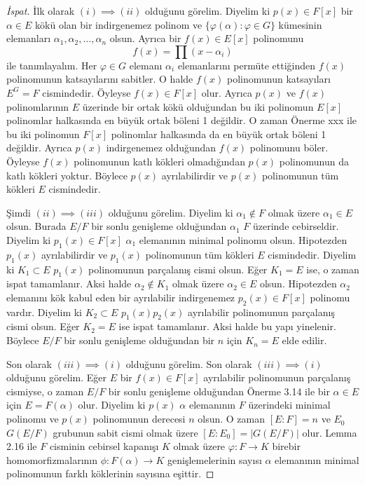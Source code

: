 \documentclass[draft]{article}
\theoremstyle{definition}
\theoremstyle{remark}
\newcommand{\envert}[1]{\left\lvert#1\right\rvert}
\let\abs=\envert
\begin{document}
    		\begin{proof}[İspat]
    	        İlk olarak $(i) \implies (ii)$ olduğunu görelim. Diyelim ki $p(x) \in F[x]$ bir $\alpha \in E$ kökü olan bir indirgenemez polinom ve $\{\varphi(\alpha) : \varphi \in G\}$ kümesinin elemanları $\alpha_1, \alpha_2, \dots, \alpha_n$ olsun. Ayrıca bir $f(x) \in E[x]$ polinomunu
    	        \begin{equation*}
    	            f(x) = \prod{(x - \alpha_i)}
    	        \end{equation*}
    	        ile tanımlayalım. Her $\varphi \in G$ elemanı $\alpha_i$ elemanlarını permüte ettiğinden $f(x)$ polinomunun katsayılarını sabitler. O halde $f(x)$ polinomunun katsayıları $E^G = F$ cismindedir. Öyleyse $f(x) \in F[x]$ olur. Ayrıca $p(x)$ ve $f(x)$ polinomlarının $E$ üzerinde bir ortak kökü olduğundan bu iki polinomun $E[x]$ polinomlar halkasında en büyük ortak böleni 1 değildir. O zaman Önerme xxx ile bu iki polinomun $F[x]$ polinomlar halkasında da en büyük ortak böleni 1 değildir. Ayrıca $p(x)$ indirgenemez olduğundan $f(x)$ polinomunu böler. Öyleyse $f(x)$ polinomunun katlı kökleri olmadığından $p(x)$ polinomunun da katlı kökleri yoktur. Böylece $p(x)$ ayrılabilirdir ve $p(x)$ polinomunun tüm kökleri $E$ cismindedir.\par
    	        Şimdi $(ii) \implies (iii)$ olduğunu görelim. Diyelim ki $\alpha_1 \notin F$ olmak üzere $\alpha_1 \in E$ olsun. Burada $E/F$ bir sonlu genişleme olduğundan $\alpha_1$ $F$ üzerinde cebirseldir. Diyelim ki $p_1(x) \in F[x]$ $\alpha_1$ elemanının minimal polinomu olsun. Hipotezden $p_1(x)$ ayrılabilirdir ve $p_1(x)$ polinomunun tüm kökleri $E$ cismindedir. Diyelim ki $K_1 \subset E$ $p_1(x)$ polinomunun parçalanış cismi olsun. Eğer $K_1 = E$ ise, o zaman ispat tamamlanır. Aksi halde $\alpha_2 \notin K_1$ olmak üzere $\alpha_2 \in E$ olsun. Hipotezden $\alpha_2$ elemanını kök kabul eden bir ayrılabilir indirgenemez $p_2(x) \in F[x]$ polinomu vardır. Diyelim ki $K_2 \subset E$ $p_1(x)p_2(x)$ ayrılabilir polinomunun parçalanış cismi olsun. Eğer $K_2 = E$ ise ispat tamamlanır. Aksi halde bu yapı yinelenir. Böylece $E/F$ bir sonlu genişleme olduğundan bir $n$ için $K_n = E$ elde edilir.\par
    	        Son olarak $(iii) \implies (i)$ olduğunu görelim. Son olarak $(iii) \implies (i)$ olduğunu görelim. Eğer $E$ bir $f(x) \in F[x]$ ayrılabilir polinomunun parçalanış cismiyse, o zaman $E/F$ bir sonlu genişleme olduğundan Önerme 3.14 ile bir $\alpha \in E$ için $E = F(\alpha)$ olur. Diyelim ki $p(x)$ $\alpha$ elemanının $F$ üzerindeki minimal polinomu ve $p(x)$ polinomunun derecesi $n$ olsun. O zaman $[E : F] = n$ ve $E_0$ $G(E/F)$ grubunun sabit cismi olmak üzere $[E : E_0] = \abs{G(E/F)}$ olur. Lemma 2.16 ile $F$ cisminin cebirsel kapanışı $K$ olmak üzere $\varphi: F \to K$ birebir homomorfizmalarının $\phi: F(\alpha) \to K$ genişlemelerinin sayısı $\alpha$ elemanının minimal polinomunun farklı köklerinin sayısına eşittir.
    	    \end{proof}
    	    
\end{document}
